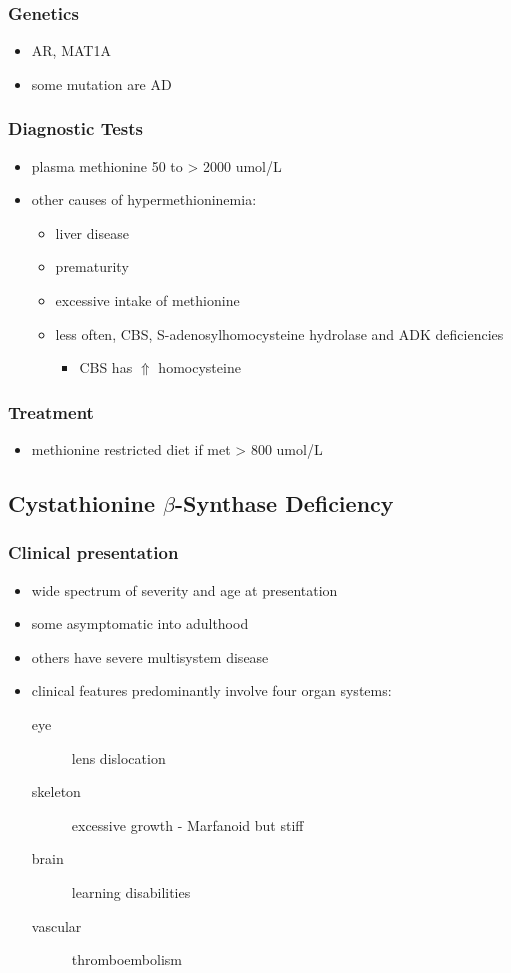 \documentclass{scrartcl}
\begin{document}
\subsubsection{Genetics}
\label{sec:orgf9309be}
\begin{itemize}
\item AR, MAT1A
\item some mutation are AD
\end{itemize}
\subsubsection{Diagnostic Tests}
\label{sec:org1377b82}
\begin{itemize}
\item plasma methionine 50 to \textgreater{} 2000 umol/L
\item other causes of hypermethioninemia:
\begin{itemize}
\item liver disease
\item prematurity
\item excessive intake of methionine
\item less often, CBS, S-adenosylhomocysteine hydrolase and ADK deficiencies
\begin{itemize}
\item CBS has \(\Uparrow\) homocysteine
\end{itemize}
\end{itemize}
\end{itemize}
\subsubsection{Treatment}
\label{sec:orgcf097f9}
\begin{itemize}
\item methionine restricted diet if met \textgreater{} 800 umol/L
\end{itemize}

\subsection{Cystathionine \(\beta\)-Synthase Deficiency}
\label{sec:orgc4a85a2}
\subsubsection{Clinical presentation}
\label{sec:org28e6089}
\begin{itemize}
\item wide spectrum of severity and age at presentation
\item some asymptomatic into adulthood
\item others have severe multisystem disease
\item clinical features predominantly involve four organ systems:
\begin{description}
\item[{eye}] lens dislocation
\item[{skeleton}] excessive growth - Marfanoid but stiff
\item[{brain}] learning disabilities
\item[{vascular}] thromboembolism
\end{description}
\end{itemize}
\end{document}
